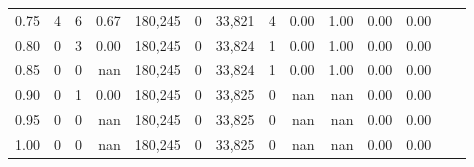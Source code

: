 \begin{tabular}{rrrrrrrrrrrrrr}
0.75 &       4 &       6 &    0.67 &  180,245 &        0 &  33,821 &       4 &  0.00 &  1.00 &  0.00 &      0.00 \\
0.80 &       0 &       3 &    0.00 &  180,245 &        0 &  33,824 &       1 &  0.00 &  1.00 &  0.00 &      0.00 \\
0.85 &       0 &       0 &     nan &  180,245 &        0 &  33,824 &       1 &  0.00 &  1.00 &  0.00 &      0.00 \\
0.90 &       0 &       1 &    0.00 &  180,245 &        0 &  33,825 &       0 &   nan &   nan &  0.00 &      0.00 \\
0.95 &       0 &       0 &     nan &  180,245 &        0 &  33,825 &       0 &   nan &   nan &  0.00 &      0.00 \\
1.00 &       0 &       0 &     nan &  180,245 &        0 &  33,825 &       0 &   nan &   nan &  0.00 &      0.00 \\
\bottomrule
\end{tabular}
